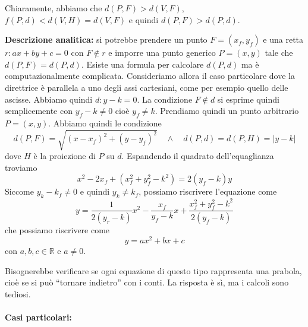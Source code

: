 \documentclass[a4paper]{article}
\begin{document}
\begin{center}
\end{center}

Chiaramente, abbiamo che \(d(P, F) > d(V, F)\), \(f(P,d) < d(V, H) = d(V,F)\)
e quindi \(d(P, F) > d(P,d)\).

\textbf{Descrizione analitica:} si potrebbe prendere un punto \(F=(x_f, y_f)\)
e una retta \(r\colon ax + by + c=0\) con \(F\not\in r\) e imporre
una punto generico \(P=(x,y)\) tale che \(d(P, F) = d(P, d)\).
Esiste una formula per calcolare \(d(P, d)\) ma è computazionalmente complicata.
Consideriamo allora il caso particolare dove la direttrice è parallela a uno degli assi cartesiani,
come per esempio quello delle ascisse.
Abbiamo quindi \(d\colon y-k=0\). La condizione \(F\not\in d\) si esprime quindi semplicemente con
\(y_f - k \neq 0\) cioè \(y_f \neq k\). Prendiamo quindi un punto arbitrario \(P=(x,y)\).
Abbiamo quindi le condizione
\[
    d(P,F) = \sqrt{{(x-x_f)}^2 +{(y-y_f)}^2} \quad \land \quad
    d(P, d) = d(P, H) = |y-k|
\]
dove \(H\) è la proiezione di \(P\) su \(d\).
Espandendo il quadrato dell'equaglianza troviamo
\[ x^2 - 2x_f + \left(x_f^2 + y_f^2 - k^2\right) = 2(y_f-k)y \]
Siccome \(y_k - k_f \neq 0\) e quindi \(y_k \neq k_f\), possiamo riscrivere l'equazione come
\[
    y = \frac{1}{2(y_r - k)}x^2 - \frac{x_f}{y_f-k}x + \frac{x_f^2 + y_f^2 - k^2}{2(y_f-k)}
\]
che possiamo riscrivere come
\[
    y = ax^2 + bx + c
\]
con \(a,b,c\in\mathbb{R}\) e \(a\neq 0\).

Bisognerebbe verificare se ogni equazione di questo tipo rappresenta una prabola, cioè se
si può ``tornare indietro'' con i conti. La risposta è sì, ma i calcoli sono tediosi.

\paragraph{Casi particolari:}\phantom{ }
\end{document}
